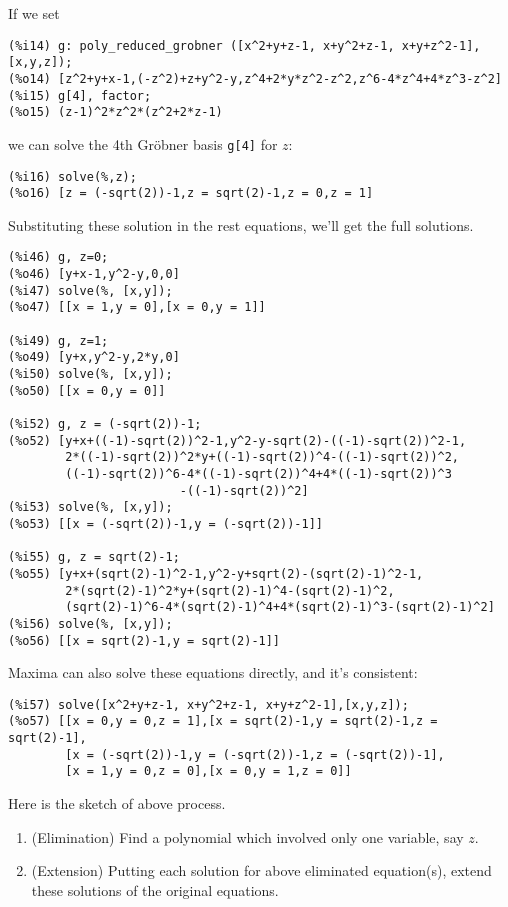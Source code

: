 \documentclass[11pt]{book}
\begin{document}
If we set
\begin{verbatim}
(%i14) g: poly_reduced_grobner ([x^2+y+z-1, x+y^2+z-1, x+y+z^2-1],[x,y,z]);
(%o14) [z^2+y+x-1,(-z^2)+z+y^2-y,z^4+2*y*z^2-z^2,z^6-4*z^4+4*z^3-z^2]
(%i15) g[4], factor;
(%o15) (z-1)^2*z^2*(z^2+2*z-1)
\end{verbatim}
we can solve the 4th Gr\"obner basis \verb|g[4]| for $z$:
\begin{verbatim}
(%i16) solve(%,z);
(%o16) [z = (-sqrt(2))-1,z = sqrt(2)-1,z = 0,z = 1]
\end{verbatim}
Substituting these solution in the rest equations, we'll get the full solutions.
\begin{verbatim}
(%i46) g, z=0;
(%o46) [y+x-1,y^2-y,0,0]
(%i47) solve(%, [x,y]);
(%o47) [[x = 1,y = 0],[x = 0,y = 1]]

(%i49) g, z=1;
(%o49) [y+x,y^2-y,2*y,0]
(%i50) solve(%, [x,y]);
(%o50) [[x = 0,y = 0]]

(%i52) g, z = (-sqrt(2))-1;
(%o52) [y+x+((-1)-sqrt(2))^2-1,y^2-y-sqrt(2)-((-1)-sqrt(2))^2-1,
        2*((-1)-sqrt(2))^2*y+((-1)-sqrt(2))^4-((-1)-sqrt(2))^2,
        ((-1)-sqrt(2))^6-4*((-1)-sqrt(2))^4+4*((-1)-sqrt(2))^3
                        -((-1)-sqrt(2))^2]
(%i53) solve(%, [x,y]);
(%o53) [[x = (-sqrt(2))-1,y = (-sqrt(2))-1]]

(%i55) g, z = sqrt(2)-1;
(%o55) [y+x+(sqrt(2)-1)^2-1,y^2-y+sqrt(2)-(sqrt(2)-1)^2-1,
        2*(sqrt(2)-1)^2*y+(sqrt(2)-1)^4-(sqrt(2)-1)^2,
        (sqrt(2)-1)^6-4*(sqrt(2)-1)^4+4*(sqrt(2)-1)^3-(sqrt(2)-1)^2]
(%i56) solve(%, [x,y]);
(%o56) [[x = sqrt(2)-1,y = sqrt(2)-1]]
\end{verbatim}
Maxima can also solve these equations directly, and it's consistent:
\begin{verbatim}
(%i57) solve([x^2+y+z-1, x+y^2+z-1, x+y+z^2-1],[x,y,z]);
(%o57) [[x = 0,y = 0,z = 1],[x = sqrt(2)-1,y = sqrt(2)-1,z = sqrt(2)-1],
        [x = (-sqrt(2))-1,y = (-sqrt(2))-1,z = (-sqrt(2))-1],
        [x = 1,y = 0,z = 0],[x = 0,y = 1,z = 0]]
\end{verbatim}

Here is the sketch of above process.
\begin{enumerate}
\item (Elimination)
Find a polynomial which involved only one variable, say $z$.

\item (Extension)
Putting each solution for above eliminated equation(s), extend these solutions of the original equations.
\end{enumerate}
\end{document}
